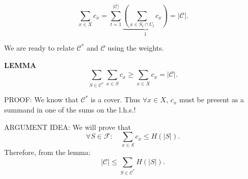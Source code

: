 \begin{notesresult}
\[\sum_{x\in X}c_x=\sum_{t=1}^{|\mathcal C|}
\underbrace{\left(\sum_{x\in S_t\cap U_t}c_x\right)}_{1}=|\mathcal C|.\]
\end{notesresult}
We are ready to relate $\mathcal C^*$ and $\mathcal C$ using the weights.
\begin{notesresult}
\textbf{LEMMA}
\[\sum_{S\in\mathcal C^*}\sum_{x\in S}c_x\geq\sum_{x\in X}c_x=|\mathcal C|.\]
\end{notesresult}
PROOF: We know that $\mathcal C^*$ is a cover. Thus $\forall x\in X$, $c_x$ must be present as a summand in one of the sums on the l.h.s.!

ARGUMENT IDEA: We will prove that
\[\forall S\in\mathcal F:\quad\sum_{x\in S}c_x\leq H(|S|).\]
Therefore, from the lemma:
\[|\mathcal C|\leq\sum_{S\in\mathcal C^*}H(|S|).\]

